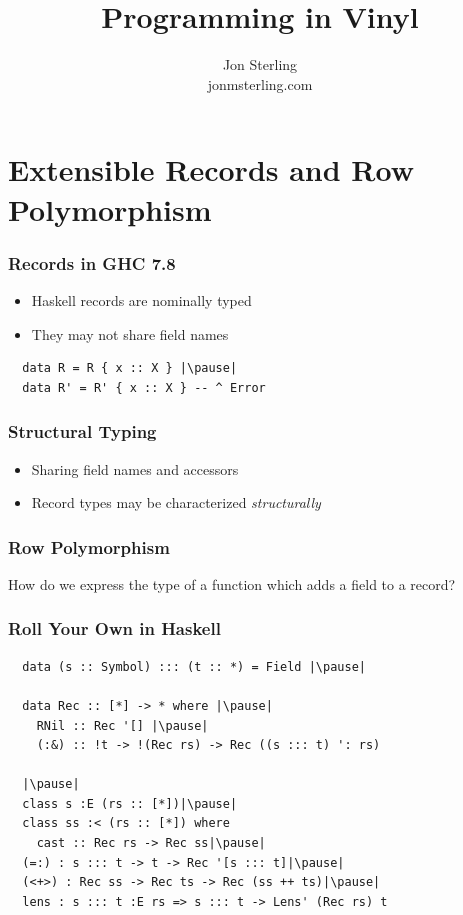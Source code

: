 \documentclass[tikz, 12pt]{beamer}
\title{Programming in Vinyl}
\author{Jon Sterling\\
  jonmsterling.com
}
\begin{document}
\begin{frame}
\titlepage
\end{frame}

\section{Extensible Records and Row Polymorphism}

\begin{frame}[fragile]
  \frametitle{Records in GHC 7.8}\pause
  \begin{itemize}
    \item Haskell records are nominally typed\pause
    \item They may not share field names
  \end{itemize}
  \pause
  \begin{lstlisting}
  data R = R { x :: X } |\pause|
  data R' = R' { x :: X } -- ^ Error
  \end{lstlisting}
\end{frame}

\begin{frame}
  \frametitle{Structural Typing}\pause
  \begin{itemize}
    \item Sharing field names and accessors\pause
    \item Record types may be characterized \emph{structurally}
  \end{itemize}
\end{frame}

\begin{frame}
  \frametitle{Row Polymorphism}\pause
  How do we express the type of a function which adds a field to a record?\pause
\end{frame}

\begin{frame}[fragile]
  \frametitle{Roll Your Own in Haskell}\pause
  \begin{lstlisting}
  data (s :: Symbol) ::: (t :: *) = Field |\pause|

  data Rec :: [*] -> * where |\pause|
    RNil :: Rec '[] |\pause|
    (:&) :: !t -> !(Rec rs) -> Rec ((s ::: t) ': rs)

  |\pause|
  class s :E (rs :: [*])|\pause|
  class ss :< (rs :: [*]) where
    cast :: Rec rs -> Rec ss|\pause|
  (=:) : s ::: t -> t -> Rec '[s ::: t]|\pause|
  (<+>) : Rec ss -> Rec ts -> Rec (ss ++ ts)|\pause|
  lens : s ::: t :E rs => s ::: t -> Lens' (Rec rs) t
  \end{lstlisting}
\end{frame}
\end{document}
